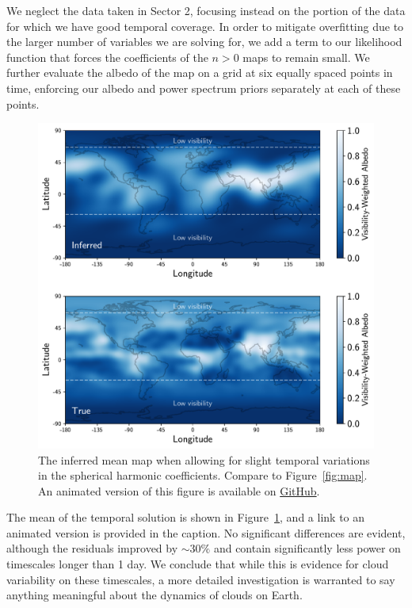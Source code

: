\documentclass[modern]{aastex62}
\begin{document}
We neglect the data taken in Sector 2, focusing instead on the portion of the data for which
we have good temporal coverage. In order to mitigate overfitting due to
the larger number of variables we are solving for,
we add a term to our likelihood function that forces the coefficients
of the $n > 0$ maps to remain small. We further evaluate the albedo of the map
on a grid at six equally spaced points in time, enforcing our albedo and
power spectrum priors separately at each of these points.

\begin{figure}[p!]
    \begin{centering}
    \includegraphics[width=\linewidth]{figures/map_temporal.pdf}
    \caption{\label{fig:map_temporal}
             The inferred mean map when allowing for slight temporal
             variations in the spherical harmonic coefficients. Compare
             to Figure~\ref{fig:map}. An animated version of this figure
             is available on 
             \href{https://github.com/rodluger/earthshine/blob/master/tex/figures/map_temporal.mp4}{GitHub}.
             }
    \end{centering}
\end{figure}

The mean of the temporal solution is shown in Figure~\ref{fig:map_temporal},
and a link to an animated version is provided in the caption. No significant
differences are evident, although the residuals improved by ${\sim}30\%$
and contain significantly less power on timescales longer than 1 day.
We conclude that while this is evidence for cloud variability on these
timescales, a more detailed investigation is warranted to say anything
meaningful about the dynamics of clouds on Earth.
\end{document}
